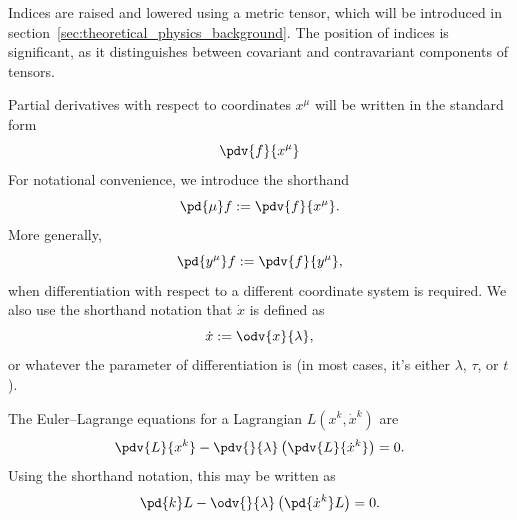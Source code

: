 Indices are raised and lowered using a metric tensor, which will be introduced in section~\ref{sec:theoretical_physics_background}. The position of indices is significant, as it distinguishes between covariant and contravariant components of tensors.

Partial derivatives with respect to coordinates $x^\mu$ will be written in the standard form
\[%
  \pdv{f}{x^\mu}
\]%
For notational convenience, we introduce the shorthand
\[%
  \pd{\mu} f := \pdv{f}{x^\mu}
.\]%
More generally,
\[%
  \pd{y^\mu} f := \pdv{f}{y^\mu}
,\]%
when differentiation with respect to a different coordinate system is required. We also use the shorthand notation that $\dot{x}$ is defined as
\[%
  \dot{x} := \odv{x}{\lambda}
,\]%
or whatever the parameter of differentiation is (in most cases, it's either $\lambda$, $\tau$, or $t$).

\begin{example}
  The Euler–Lagrange equations for a Lagrangian $L(x^k, \dot{x}^k)$ are
  \[%
    \pdv{L}{x^k} - \pdv{}{\lambda} \left(\pdv{L}{\dot{x}^k}\right) = 0
  .\]%
  Using the shorthand notation, this may be written as
  \[%
    \pd{k} L - \odv{}{\lambda} \left(\pd{\dot{x}^k} L\right) = 0
  .\]%
\end{example}
